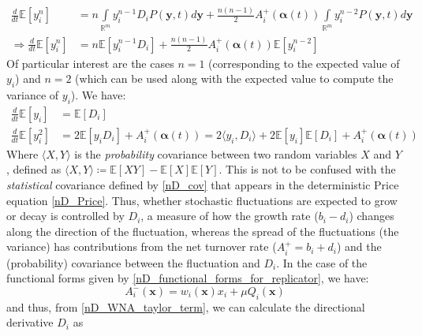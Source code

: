 \begin{align}
\frac{d}{dt}\mathbb{E}[y_i^n] &= n\int\limits_{\mathbb{R}^m} y_i^{n-1}D_{i}P(\mathbf{y},t)d\mathbf{y} + \frac{n(n-1)}{2}A_i^+(\boldsymbol{\alpha}(t))\int\limits_{\mathbb{R}^m} y_i^{n-2}P(\mathbf{y},t)d\mathbf{y}\\
\Rightarrow \frac{d}{dt}\mathbb{E}[y_i^n] &= n\mathbb{E}[y_i^{n-1}D_{i}]+\frac{n(n-1)}{2}A_i^+(\boldsymbol{\alpha}(t))\mathbb{E}[y_i^{n-2}]\label{nD_general_moment_eqns}
\end{align}
Of particular interest are the cases $n=1$ (corresponding to the expected value of $y_i$) and $n=2$ (which can be used along with the expected value to compute the variance of $y_i$). We have:
\begin{align}
\frac{d}{dt}\mathbb{E}[y_i] &= \mathbb{E}[D_{i}]\label{nD_moment_eqn_mean}\\
\frac{d}{dt}\mathbb{E}[y_i^2] &= 2\mathbb{E}[y_iD_{i}] +  A_i^+(\boldsymbol{\alpha}(t)) = 2\langle y_i,D_i \rangle + 2\mathbb{E}[y_i]\mathbb{E}[D_i]+A_i^+(\boldsymbol{\alpha}(t))\label{nD_moment_eqn_2nd_mom}
\end{align}
Where $\langle X, Y \rangle$ is the \emph{probability} covariance between two random variables $X$ and $Y$, defined as $\langle X, Y \rangle \coloneqq \mathbb{E}[XY] -  \mathbb{E}[X]\mathbb{E}[Y]$. This is not to be confused with the \emph{statistical} covariance defined by \eqref{nD_cov} that appears in the deterministic Price equation \eqref{nD_Price}. Thus, whether stochastic fluctuations are expected to grow or decay is controlled by $D_i$, a measure of how the growth rate ($b_i - d_i$) changes along the direction of the fluctuation, whereas the spread of the fluctuations (the variance) has contributions from the net turnover rate ($A_i^+ = b_i + d_i$) and the (probability) covariance between the fluctuation and $D_i$. In the case of the functional forms given by \eqref{nD_functional_forms_for_replicator}, we have:
\begin{equation}
A_i^-(\mathbf{x}) = w_i(\mathbf{x})x_i + \mu Q_i(\mathbf{x})
\end{equation}
and thus, from \eqref{nD_WNA_taylor_term}, we can calculate the directional derivative $D_i$ as
